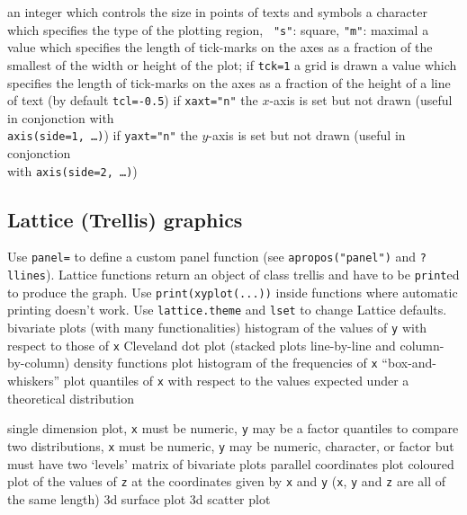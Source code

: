 	{ an integer which controls the size in points of texts and symbols}
	{ a character which specifies the type of the plotting region, {\tt
"s"}: square, {\tt "m"}: maximal}
	{a value which specifies the length of tick-marks on the axes as a
fraction of the smallest of the width or height of the plot; if {\tt tck=1} a
grid is drawn}
	{ a value which specifies the length of tick-marks on the axes as a fraction of the height of a line of text (by default {\tt tcl=-0.5})}
	{if {\tt xaxt="n"} the $x$-axis is set but not drawn (useful in
    conjonction with\\
    {\tt axis(side=1, \ldots)})}
	{if {\tt yaxt="n"} the $y$-axis is set but not drawn (useful in
conjonction \\with {\tt axis(side=2, \ldots)})}

\subsection{Lattice (Trellis) graphics}{ Use {\tt panel=} to define a custom panel
    function (see {\tt apropos("panel")} and {\tt ?llines}). Lattice functions
    return an object of class trellis and have to be {\tt print}ed to produce
    the graph. Use {\tt print(xyplot(...))} inside functions where automatic
    printing doesn't work. Use {\tt lattice.theme} and {\tt lset} to change
    Lattice defaults.}
	{ bivariate plots (with many functionalities)}
	{  histogram of the values of {\tt y} with respect to those of {\tt x}}
	{ Cleveland dot plot (stacked plots line-by-line and
column-by-column)}
	{ density functions plot}
	{ histogram of the frequencies of {\tt x}}
	{ ``box-and-whiskers'' plot}
	{  quantiles of {\tt x} with respect to the values
expected under a theoretical distribution}

	{  single dimension plot, {\tt x} must be numeric, {\tt y} may be a factor}
	{quantiles to compare two distributions, {\tt x} must be
numeric, {\tt y} may be numeric, character, or factor but must have two
`levels'}
	{ matrix of bivariate plots}
	{ parallel coordinates plot}
	{coloured plot of the values of {\tt z} at
the coordinates given by {\tt x} and {\tt y} ({\tt x}, {\tt y} and {\tt z} are
all of the same length)}
	{ 3d surface plot}
	{ 3d scatter plot}

